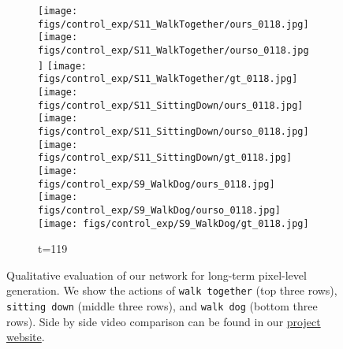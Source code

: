 \documentclass{article}
\begin{document}
\begin{appendix}
\begin{figure*}[!thbp]
\begin{subfigure}{0.12\linewidth}
	\end{subfigure}
	\begin{subfigure}{0.12\linewidth}
        \caption*{t=119}
        \vspace{-7pt}
	    \texttt{[image: figs/control\_exp/S11\_WalkTogether/ours\_0118.jpg]}
	    \texttt{[image: figs/control\_exp/S11\_WalkTogether/ourso\_0118.jpg]}
	    \vspace{.2cm}
  		\texttt{[image: figs/control\_exp/S11\_WalkTogether/gt\_0118.jpg]}
  		\texttt{[image: figs/control\_exp/S11\_SittingDown/ours\_0118.jpg]}
  		\texttt{[image: figs/control\_exp/S11\_SittingDown/ourso\_0118.jpg]}
  		\vspace{.2cm}
  		\texttt{[image: figs/control\_exp/S11\_SittingDown/gt\_0118.jpg]}
  		\texttt{[image: figs/control\_exp/S9\_WalkDog/ours\_0118.jpg]}
  		\texttt{[image: figs/control\_exp/S9\_WalkDog/ourso\_0118.jpg]}
  		\vspace{.2cm}
  		\texttt{[image: figs/control\_exp/S9\_WalkDog/gt\_0118.jpg]}
	\end{subfigure}
    \vspace{-10pt}
    \caption{Qualitative evaluation of our network for long-term pixel-level generation.  We show the actions of \texttt{walk together} (top three rows), \texttt{sitting down} (middle three rows), and \texttt{walk dog} (bottom three rows). Side by side video comparison can be found in our \href{https://goo.gl/U7UOfy}{project website}.}
\label{fig:h36mgtft2}
\vspace{-40pt}
\end{figure*}


\end{appendix}
\end{document}
